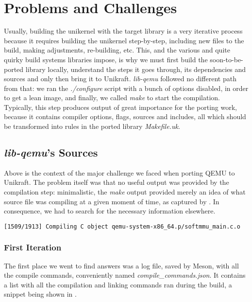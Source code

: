 \chapter{Problems and Challenges}
\label{chapter:problems-challenges}

Usually, building the unikernel with the target library is a very iterative process because it requires building the unikernel step-by-step, including new files to the build, making adjustments, re-building, etc.
This, and the various and quite quirky build systems libraries impose, is why we must first build the soon-to-be-ported library locally, understand the steps it goes through, its dependencies and sources and only then bring it to Unikraft.
\textit{lib-qemu} followed no different path from that: we ran the \textit{./configure} script with a bunch of options disabled, in order to get a lean image, and finally, we called \textit{make} to start the compilation.
Typically, this step produces output of great importance for the porting work, because it contains compiler options, flags, sources and includes, all which should be transformed into rules in the ported library \textit{Makefile.uk}.

\section{\textit{lib-qemu}'s Sources}
\label{sec:lib-qemu-sources}

Above is the context of the major challenge we faced when porting QEMU to Unikraft.
The problem itself was that no useful output was provided by the compilation step: minimalistic, the \textit{make} output provided merely an idea of what source file was compiling at a given moment of time, as captured by .
In consequence, we had to search for the necessary information elsewhere. 

\begin{lstlisting}
[1509/1913] Compiling C object qemu-system-x86_64.p/softmmu_main.c.o
\end{lstlisting}

\subsection{First Iteration}
\label{subsec:first-iteration}

The first place we went to find answers was a log file, saved by Meson, with all the compile commands, conveniently named \textit{compile_commands.json}.
It contains a list with all the compilation and linking commands ran during the build, a snippet being shown in .

